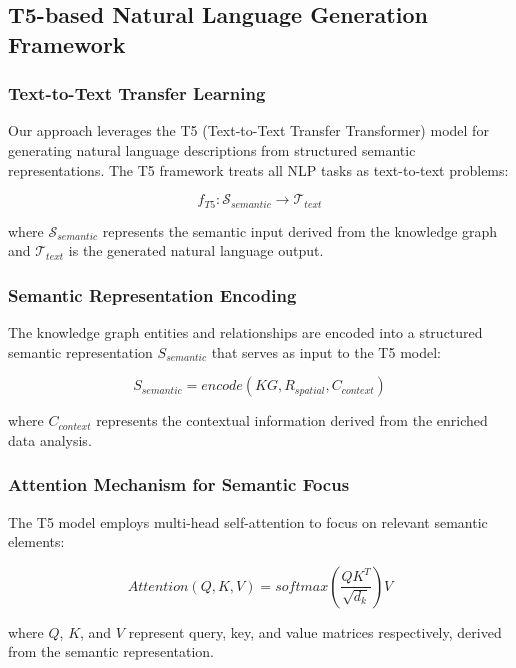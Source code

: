 \documentclass[runningheads,14pt]{llncs}
\begin{document}
\subsection{T5-based Natural Language Generation Framework}

\subsubsection{Text-to-Text Transfer Learning}
Our approach leverages the T5 (Text-to-Text Transfer Transformer) model \cite{raffel2020exploring} for generating natural language descriptions from structured semantic representations. The T5 framework treats all NLP tasks as text-to-text problems:

\begin{equation}
f_{T5}: \mathcal{S}_{semantic} \rightarrow \mathcal{T}_{text}
\end{equation}

where $\mathcal{S}_{semantic}$ represents the semantic input derived from the knowledge graph and $\mathcal{T}_{text}$ is the generated natural language output.

\subsubsection{Semantic Representation Encoding}
The knowledge graph entities and relationships are encoded into a structured semantic representation $S_{semantic}$ that serves as input to the T5 model:

\begin{equation}
S_{semantic} = encode(KG, R_{spatial}, C_{context})
\end{equation}

where $C_{context}$ represents the contextual information derived from the enriched data analysis.

\subsubsection{Attention Mechanism for Semantic Focus}
The T5 model employs multi-head self-attention to focus on relevant semantic elements:

\begin{equation}
Attention(Q, K, V) = softmax\left(\frac{QK^T}{\sqrt{d_k}}\right)V
\end{equation}

where $Q$, $K$, and $V$ represent query, key, and value matrices respectively, derived from the semantic representation.
\end{document}
